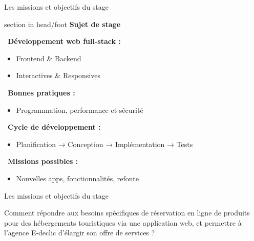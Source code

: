 \documentclass{beamer}
\begin{document}
\begin{frame}{Les missions et objectifs du stage}

	\begin{beamercolorbox}[wd=\paperwidth,ht=1.5em,dp=0.5em,leftskip=0.5cm]{section in head/foot}
  		\large \textbf{Sujet de stage}
	\end{beamercolorbox}
	\vspace{0.2em}
	
	\begin{center}
  		\begin{minipage}{1\textwidth}				

    			\faLaptopCode\ \textbf{Développement web full-stack :}
      		\begin{itemize}
        			\item Frontend \& Backend
        			\item Interactives \& Responsives
      		\end{itemize}

			\pause

    			\vspace{0.5em}
    			\faCheckCircle\ \textbf{Bonnes pratiques :}
      		\begin{itemize}
        			\item Programmation, performance et sécurité
      		\end{itemize}

			\pause

    			\vspace{0.5em}
    			\faProjectDiagram\ \textbf{Cycle de développement :}
      		\begin{itemize}
        			\item Planification → Conception → Implémentation → Tests
      		\end{itemize}

			\pause

    			\vspace{0.5em}
    			\faTasks\ \textbf{Missions possibles :}
      		\begin{itemize}
        			\item Nouvelles apps, fonctionnalités, refonte
      		\end{itemize}
  		\end{minipage}
	\end{center}
	\vfill
\end{frame}

\begin{frame}{Les missions et objectifs du stage}

	Comment répondre aux besoins spécifiques de réservation en ligne de produits pour des hébergements touristiques via une application web, et permettre à l’agence E-declic d’élargir son offre de services ?
			
	\begin{center}
  		\begin{minipage}{0.9\textwidth}
  			\vspace{10cm}
  		\end{minipage}
	\end{center}
	\vfill
\end{frame}
\end{document}

